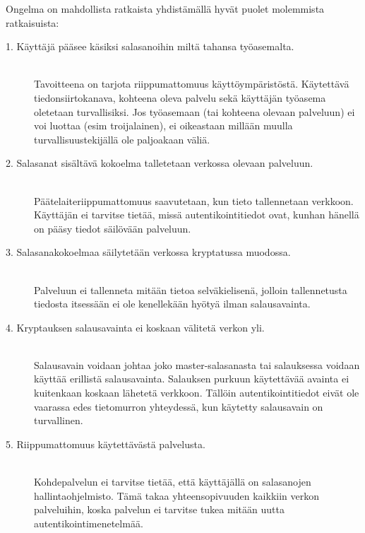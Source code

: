 \documentclass[english,gradu]{tktltiki}
\begin{document}
         Ongelma on mahdollista ratkaista yhdistämällä hyvät puolet molemmista ratkaisuista:

         \begin{description}

           \item[1. Käyttäjä pääsee käsiksi salasanoihin miltä tahansa työasemalta.] \hfill \\
               Tavoitteena on tarjota riippumattomuus käyttöympäristöstä.
               Käytettävä tiedonsiirtokanava, kohteena oleva palvelu sekä käyttäjän työasema oletetaan turvallisiksi.
               Jos työasemaan (tai kohteena olevaan palveluun) ei voi luottaa (esim troijalainen),
               ei oikeastaan millään muulla turvallisuustekijällä ole paljoakaan väliä.

           \item[2. Salasanat sisältävä kokoelma talletetaan verkossa olevaan palveluun.] \hfill \\
               Päätelaiteriippumattomuus saavutetaan, kun tieto tallennetaan verkkoon.
               Käyttäjän ei tarvitse tietää, missä autentikointitiedot ovat, kunhan hänellä on pääsy
               tiedot säilövään palveluun.

           \item[3. Salasanakokoelmaa säilytetään verkossa kryptatussa muodossa.] \hfill \\
               Palveluun ei tallenneta mitään tietoa selväkielisenä, jolloin tallennetusta tiedosta itsessään
               ei ole kenellekään hyötyä ilman salausavainta.

           \item[4. Kryptauksen salausavainta ei koskaan välitetä verkon yli.] \hfill \\
               Salausavain voidaan johtaa joko master-salasanasta tai salauksessa voidaan käyttää erillistä
               salausavainta. Salauksen purkuun käytettävää avainta ei kuitenkaan koskaan lähetetä verkkoon. Tällöin
               autentikointitiedot eivät ole vaarassa edes tietomurron yhteydessä, kun käytetty salausavain on
               turvallinen.

           \item[5. Riippumattomuus käytettävästä palvelusta.] \hfill \\
               Kohdepalvelun ei tarvitse tietää, että käyttäjällä on salasanojen hallintaohjelmisto.
               Tämä takaa yhteensopivuuden kaikkiin verkon palveluihin, koska palvelun ei tarvitse tukea mitään uutta
               autentikointimenetelmää.


\end{description}
\end{document}
